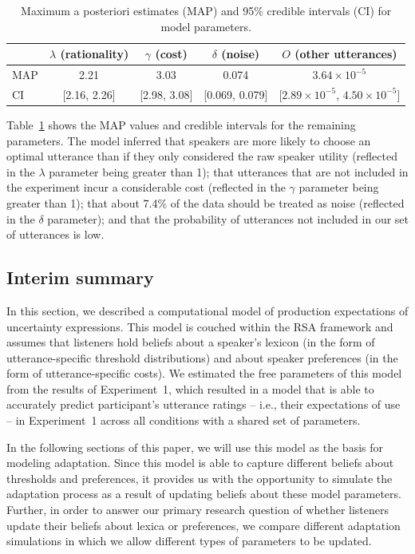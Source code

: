 \documentclass[man, floatsintext]{apa6}
\newcommand{\tableref}[1]{Table~\ref{#1}}
\begin{document}
 
 \begin{table}[ht!]
\center
\begin{tabular}{l | c | c | c | c }
     & $\lambda$ (rationality) & $\gamma$ (cost) & $\delta$ (noise) & $O$ (other utterances) \\
      \midrule
      MAP & 2.21 & 3.03 & 0.074 & $3.64 \times 10^{-5}$ \\
      CI & [2.16, 2.26] & [2.98, 3.08] &  [0.069, 0.079] &[$2.89 \times 10^{-5}$, $4.50  \times 10^{-5}$] \\
      
         \end{tabular}
\caption{Maximum a posteriori estimates (MAP) and 95\% credible intervals (CI) for model parameters. \label{tbl:model-params}}
\end{table}

  \tableref{tbl:model-params} shows the MAP values and credible intervals for the remaining parameters. The model inferred that speakers
  are more likely to choose an optimal utterance than if they only considered the raw speaker utility (reflected in the $\lambda$ parameter being
  greater than 1); that utterances that are not included in the experiment incur a considerable cost  (reflected in the $\gamma$ parameter being greater than 1); that about 7.4\%
  of the data should be treated as noise (reflected in the $\delta$ parameter); and that the probability of utterances not included in our set of utterances is low. 

 
 \subsection{Interim summary}
 
 In this section, we described a computational model of production expectations of uncertainty expressions. This model
 is couched within the RSA framework and assumes that listeners hold beliefs about a speaker's lexicon (in the form
 of utterance-specific threshold distributions) and about speaker preferences (in the form of utterance-specific costs). We estimated 
 the free parameters of this model from the results of Experiment~1, which resulted in a model that is able to accurately predict
 participant's utterance ratings -- i.e., their expectations of use --  in Experiment~1 across all conditions with a shared set of parameters.
 
 In the following sections of this paper, we will use this model as the basis for modeling adaptation. Since this model
 is able to capture different beliefs about thresholds and preferences, it provides us with the opportunity to simulate 
 the adaptation process as a result of updating beliefs about these model parameters. Further, in order to answer
 our primary research question of whether listeners update their beliefs about lexica or preferences, we compare
 different adaptation simulations in which we allow different types of parameters to be updated.
\end{document}
